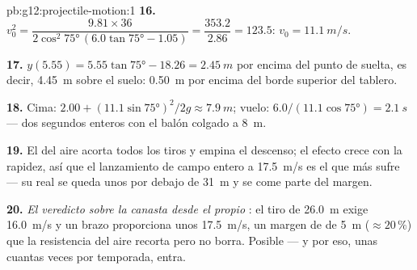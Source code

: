 \begin{solution}{pb:g12:projectile-motion:1}
\textbf{16.} $v_0^2 = \dfrac{9.81 \times 36}{2\cos^2\ang{75}\,
(6.0\tan\ang{75} - 1.05)} = \dfrac{353.2}{2.86} = 123.5$:
$v_0 = \qty{11.1}{m/s}$.

\textbf{17.} $y(5.55) = 5.55\tan\ang{75} - 18.26 = \qty{2.45}{m}$ por
encima del punto de suelta, es decir, \qty{4.45}{m} sobre el suelo:
\qty{0.50}{m} por encima del borde superior del tablero.

\textbf{18.} Cima: $2.00 + (11.1\sin\ang{75})^2/2g \approx
\qty{7.9}{m}$; vuelo: $6.0/(11.1\cos\ang{75}) = \qty{2.1}{s}$ --- dos
segundos enteros con el balón colgado a \qty{8}{m}.

\textbf{19.} El  del aire acorta todos los tiros y empina el
descenso; el efecto crece con la rapidez, así que el lanzamiento de
campo entero a \qty{17.5}{m/s} es el que más sufre --- su  real
se queda unos  por debajo de \qty{31}{m} y se come parte del
margen.

\textbf{20.} \emph{El veredicto sobre la canasta desde el propio }:
el tiro de \qty{26.0}{m} exige \qty{16.0}{m/s} y un brazo proporciona
unos \qty{17.5}{m/s}, un margen de  de \qty{5}{m}
($\approx 20\,\%$) que la resistencia del aire recorta pero no borra.
Posible --- y por eso, unas cuantas veces por temporada, entra.
\end{solution}
